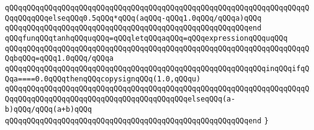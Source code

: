 \verb|qQQqqQQqqQQqqQQqqQQqqQQqqQQqqQQqqQQqqQQqqQQqqQQqqQQqqQQqqQQqqQQqqQQqqQQqqQQqqQQqelseqQQq0.5qQQq*qQQq(aqQQq-qQQq1.0qQQq/qQQqa)qQQq|\newline
\verb|qQQqqQQqqQQqqQQqqQQqqQQqqQQqqQQqqQQqqQQqqQQqqQQqqQQqqQQqend|\newline
\verb|qQQqfunqQQqtanhqQQquqQQq=qQQqletqQQqaqQQq=qQQqexpressionqQQquqQQq|\newline
\verb|qQQqqQQqqQQqqQQqqQQqqQQqqQQqqQQqqQQqqQQqqQQqqQQqqQQqqQQqqQQqqQQqqQQqqQQqbqQQq=qQQq1.0qQQq/qQQqa|\newline
\verb|qQQqqQQqqQQqqQQqqQQqqQQqqQQqqQQqqQQqqQQqqQQqqQQqqQQqqQQqqQQqinqQQqifqQQqa====0.0qQQqthenqQQqcopysignqQQq(1.0,qQQqu)|\newline
\verb|qQQqqQQqqQQqqQQqqQQqqQQqqQQqqQQqqQQqqQQqqQQqqQQqqQQqqQQqqQQqqQQqqQQqqQQqqQQqqQQqqQQqqQQqqQQqqQQqqQQqqQQqqQQqqQQqelseqQQq(a-b)qQQq/qQQq(a+b)qQQq|\newline
\verb|qQQqqQQqqQQqqQQqqQQqqQQqqQQqqQQqqQQqqQQqqQQqqQQqqQQqqQQqend|\newline
\verb|}|\newline
\newline
\newline

